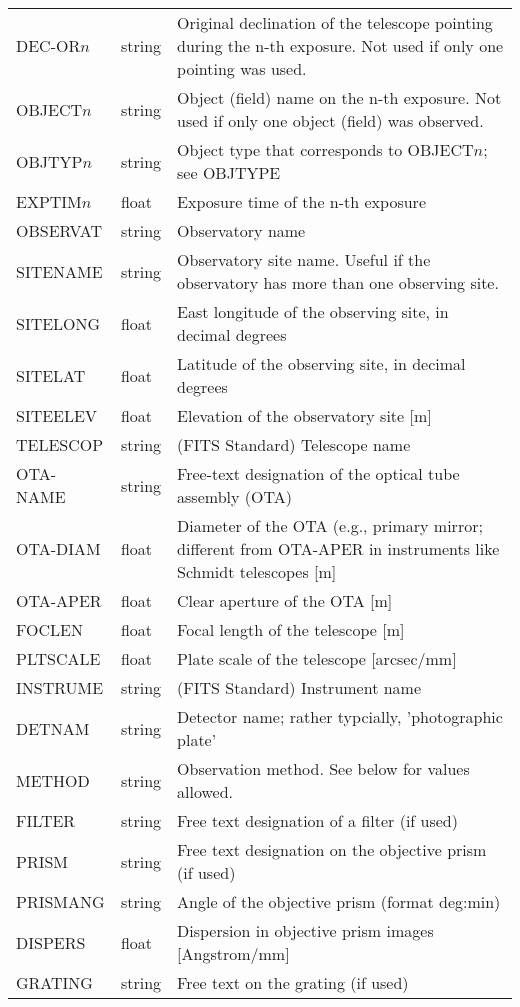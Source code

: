 \documentclass[11pt]{ivoa}
\begin{document}
\begin{longtable}{llp{}}
DEC-OR$n$ &string   &
  Original declination of the telescope pointing during the n-th
  exposure. Not used if only one pointing was used.\\
OBJECT$n$ &string  &
    Object (field) name on the n-th exposure. Not used if only
    one object (field) was observed.\\
OBJTYP$n$ &string  &Object type that corresponds to
OBJECT$n$; see OBJTYPE\\
EXPTIM$n$ &float   & Exposure time of the n-th exposure\\
OBSERVAT  &string  &Observatory name\\
SITENAME  &string  &
  Observatory site name. Useful if the observatory has more than one
  observing site.\\
SITELONG  &float   &
  East longitude of the observing site, in decimal degrees\\
SITELAT   &float   &
  Latitude of the observing site, in decimal degrees\\
SITEELEV  &float   &
  Elevation of the observatory site [m]\\
TELESCOP  &string  &(FITS Standard) Telescope name\\
OTA-NAME  &string  &Free-text designation of the optical tube assembly (OTA)\\
OTA-DIAM  &float   &Diameter of the OTA (e.g., primary mirror; different
from OTA-APER in instruments like Schmidt telescopes [m]\\
OTA-APER  &float   &Clear aperture of the OTA [m]\\
FOCLEN    &float   &Focal length of the telescope [m]\\
PLTSCALE  &float   &Plate scale of the telescope [arcsec/mm]\\
INSTRUME  &string  &(FITS Standard) Instrument name\\
DETNAM    &string  &Detector name; rather typcially, 'photographic plate'\\
METHOD    &string  &
  Observation method.  See below for values allowed.\\
FILTER    &string  &Free text designation of a filter (if used)\\
PRISM     &string  &
  Free text designation on the objective prism (if used)\\
PRISMANG  &string  &
  Angle of the objective prism (format deg:min)\\
DISPERS   &float   &Dispersion in objective prism images [Angstrom/mm]\\
GRATING   &string  &Free text on the grating (if used)\\

\end{longtable}
\end{document}
